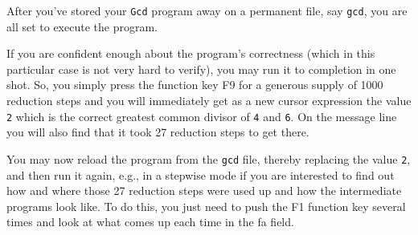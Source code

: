 After you've stored your {\tt Gcd} program away on a permanent file, say {\tt gcd},
 you are all set to execute the program.

 If you are confident enough about the program's correctness (which in this
particular case is not very hard to verify), you may
run it to completion in one shot. So, you simply press the function key
F9 for a generous supply of 1000 reduction steps and you will immediately
get as a new cursor expression the value {\tt 2} which is the correct greatest
common divisor of {\tt 4} and {\tt 6}. On the message line you will also
find that it took 27 reduction steps to get there. 

You may now reload the program from the {\tt gcd} file, thereby replacing
the value {\tt 2}, and then run it again, e.g.,  in a stepwise mode if you 
are interested to find out how and 
where those 27 reduction steps were used up and
how the intermediate programs look like. To do this, you just need to 
push the F1 function key several times and 
look at what comes up each time in the {\sc fa} field.

